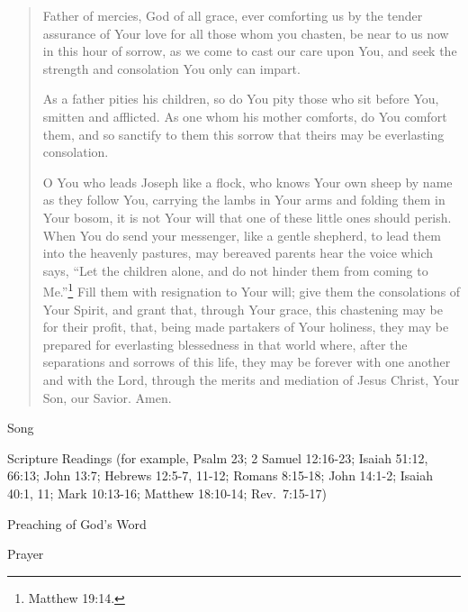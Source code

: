 \documentclass[
]{book}
\begin{document}
\begin{quote}
Father of mercies, God of all grace, ever comforting us by the tender assurance of Your love for all those whom you chasten, be near to us now in this hour of sorrow, as we come to cast our care upon You, and seek the strength and consolation You only can impart.

As a father pities his children, so do You pity those who sit before You, smitten and afflicted. As one whom his mother comforts, do You comfort them, and so sanctify to them this sorrow that theirs may be everlasting consolation.

O You who leads Joseph like a flock, who knows Your own sheep by name as they follow You, carrying the lambs in Your arms and folding them in Your bosom, it is not Your will that one of these little ones should perish. When You do send your messenger, like a gentle shepherd, to lead them into the heavenly pastures, may bereaved parents hear the voice which says, ``Let the children alone, and do not hinder them from coming to Me.''\footnote{Matthew 19:14.} Fill them with resignation to Your will; give them the consolations of Your Spirit, and grant that, through Your grace, this chastening may be for their profit, that, being made partakers of Your holiness, they may be prepared for everlasting blessedness in that world where, after the separations and sorrows of this life, they may be forever with one another and with the Lord, through the merits and mediation of Jesus Christ, Your Son, our Savior. Amen.
\end{quote}

Song

Scripture Readings (for example, Psalm 23; 2 Samuel 12:16-23; Isaiah 51:12, 66:13; John 13:7; Hebrews 12:5-7, 11-12; Romans 8:15-18; John 14:1-2; Isaiah 40:1, 11; Mark 10:13-16; Matthew 18:10-14; Rev.~7:15-17)

Preaching of God's Word

Prayer
\end{document}

